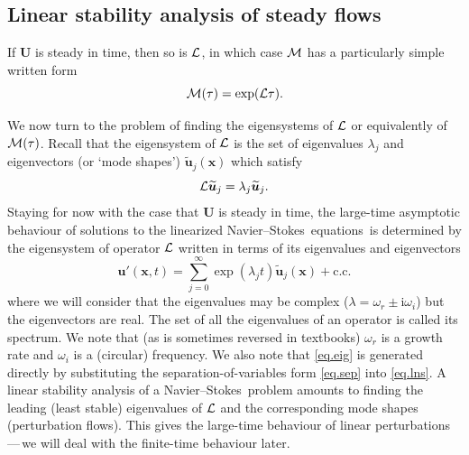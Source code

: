 \documentclass[11pt,a4paper]{report}
\newcommand\ci{\mathrm{i}}
\newcommand\wt[1]{\widetilde{#1}}
\newcommand\NavSto{Navier--Stokes}
\newcommand\LNS{linearized \NavSto}
\newcommand\LNSE{\LNS\ equations}
\newcommand\Ubase{{\bm{U}}}
\newcommand\upert{{\bm{u}'}}
\newcommand\xvec{\bm{x}}
\newcommand\Lop{{\cal L}}
\newcommand\Mop{{\cal M}}
\begin{document}
\subsection{Linear stability analysis of steady flows}

If $\Ubase$ is steady in time, then so is $\Lop$, in which case $\Mop$
has a particularly simple written form
\begin{equation}
\Mop(\tau)=\exp(\Lop\tau).
\label{eq.map}
\end{equation}

We now turn to the problem of finding the eigensystems of $\Lop$ or
equivalently of $\Mop(\tau)$.  Recall that the eigensystem of $\Lop$
is the set of eigenvalues $\lambda_j$ and eigenvectors (or `mode
shapes') $\wt{\bm{u}}_j(\xvec)$ which satisfy
\begin{equation}
\Lop \wt{\bm{u}}_j = \lambda_j \wt{\bm{u}}_j.
\label{eq.eig}
\end{equation}
Staying for now with the case that $\Ubase$ is steady in time, the
large-time asymptotic behaviour of solutions to the \LNSE\ is
determined by the eigensystem of operator $\Lop$ written in terms of
its eigenvalues and eigenvectors
\begin{equation}
\upert(\xvec, t) = \sum_{j=0}^\infty
\exp(\lambda_j t)\wt{\bm{u}}_j(\xvec) +\text{c.c.}
\label{eq.sep}
\end{equation}
where we will consider that the eigenvalues may be complex
($\lambda=\omega_r\pm\ci\omega_i$) but the eigenvectors are real. The
set of all the eigenvalues of an operator is called its spectrum. We
note that (as is sometimes reversed in textbooks) $\omega_r$ is a
growth rate and $\omega_i$ is a (circular) frequency.  We also note
that \eqref{eq.eig} is generated directly by substituting the
separation-of-variables form \eqref{eq.sep} into \eqref{eq.lns}. A
linear stability analysis of a \NavSto\ problem amounts to finding the
leading (least stable) eigenvalues of $\Lop$ and the corresponding
mode shapes (perturbation flows).  This gives the large-time behaviour
of linear perturbations\,---\,we will deal with the finite-time
behaviour later.
\end{document}
